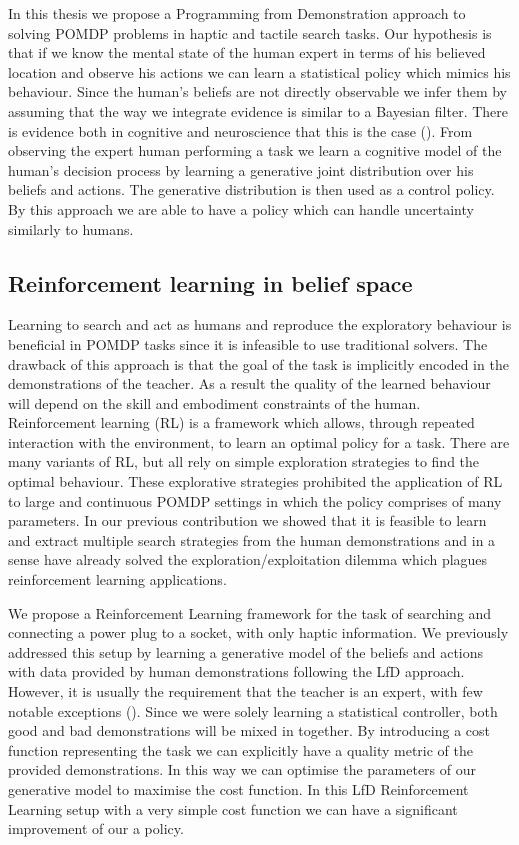 In this thesis we propose a Programming from Demonstration approach to solving POMDP problems in
haptic and tactile search tasks. Our hypothesis is that if we know the mental state of the human 
expert in terms of his believed location and observe his actions we can learn a statistical policy 
which mimics his behaviour. Since the human's beliefs are not directly observable we infer them 
by assuming that the way we integrate evidence is similar to a Bayesian filter. There is   
evidence both in cognitive and neuroscience that this is the case (\cite{Bake_Saxe_Tene_2011}). From 
observing the expert human performing a task we learn a cognitive model of the human's decision process 
by learning a generative joint distribution over his beliefs and actions. The generative distribution 
is then used as a control policy. By this approach we are able to have a policy which can handle uncertainty
similarly to humans. 

\subsection{Reinforcement learning in belief space}\label{sub:contr2}

Learning to search and act as humans and reproduce the exploratory behaviour is beneficial in POMDP tasks since
it is infeasible to use traditional solvers. The drawback of this approach is that the goal of the task is 
implicitly encoded in the demonstrations of the teacher. As a result the quality of the learned behaviour 
will depend on the skill and embodiment constraints of the human. Reinforcement learning (RL) is a framework which 
allows, through repeated interaction with the environment, to learn an optimal policy for a task. There are 
many variants of RL, but all rely on simple exploration strategies to find the optimal behaviour. These explorative 
strategies prohibited the application of RL to large and continuous POMDP settings in which the policy 
comprises of many parameters. In our previous contribution we showed that it is feasible to learn and extract 
multiple search strategies from the human demonstrations and in a sense have already solved the exploration/exploitation dilemma which 
plagues reinforcement learning applications. 

We propose a Reinforcement Learning framework for the task of searching and connecting a power plug to a socket, 
with only haptic information. 
We previously addressed this setup by learning a generative model of the beliefs and actions with data 
provided by human demonstrations following the LfD approach. However, it is usually the requirement that 
the teacher is an expert, with few notable exceptions (\cite{rai2013learning}). Since we were solely learning a 
statistical controller, both good and bad demonstrations will be mixed in together. By introducing a cost function 
representing the task we can explicitly have a quality metric of the provided demonstrations. In this way 
we can optimise the parameters of our generative model to maximise the cost function. In this LfD Reinforcement 
Learning setup with a very simple cost function we can have a significant improvement of our a policy.

